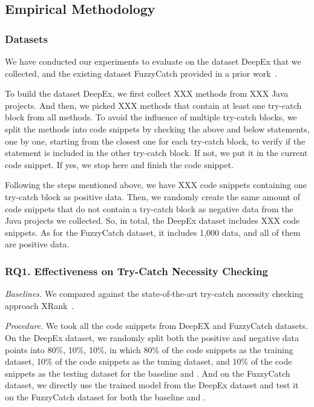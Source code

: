 \subsection{Empirical Methodology}

\subsubsection{Datasets}

We have conducted our experiments to evaluate {\tool} on the dataset DeepEx that we collected, and the existing dataset FuzzyCatch provided in a prior work~\cite{nguyen2020code}. 

To build the dataset DeepEx, we first collect XXX methods from XXX Java projects. And then, we picked XXX methods that contain at least one try-catch block from all methods. To avoid the influence of multiple try-catch blocks, we split the methods into code snippets by checking the above and below statements, one by one, starting from the closest one for each try-catch block, to verify if the statement is included in the other try-catch block. If not, we put it in the current code snippet. If yes, we stop here and finish the code snippet.

Following the steps mentioned above, we have XXX code snippets containing one try-catch block as positive data. Then, we randomly create the same amount of code snippets that do not contain a try-catch block as negative data from the Java projects we collected. So, in total, the DeepEx dataset includes XXX code snippets. As for the FuzzyCatch dataset, it includes 1,000 data, and all of them are positive data.


\subsubsection{RQ1. Effectiveness on Try-Catch Necessity Checking}

{\em Baselines.} We compared {\tool} against the state-of-the-art try-catch necessity checking approach XRank~\cite{nguyen2020code}.

{\em Procedure.} We took all the code snippets from DeepEX and FuzzyCatch datasets. On the DeepEx dataset, we randomly split both the positive and negative data points into 80\%, 10\%, 10\%, in which 80\% of the code snippets as the training dataset, 10\% of the code snippets as the tuning dataset, and 10\% of the code snippets as the testing dataset for the baseline and {\tool}. And on the FuzzyCatch dataset, we directly use the trained model from the DeepEx dataset and test it on the FuzzyCatch dataset for both the baseline and {\tool}.

